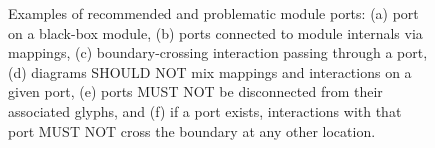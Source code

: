 \begin{enumerate}
	\begin{figure}[h!]
	\centering
	\caption{Examples of recommended and problematic module ports: (a) port on a black-box module, (b) ports connected to module internals via mappings, (c) boundary-crossing interaction passing through a port, (d) diagrams SHOULD NOT mix mappings and interactions on a given port, (e) ports MUST NOT be disconnected from their associated glyphs, and (f) if a port exists, interactions with that port MUST NOT cross the boundary at any other location.}
	\label{exa:moduleD}
	\end{figure}

\end{enumerate}


